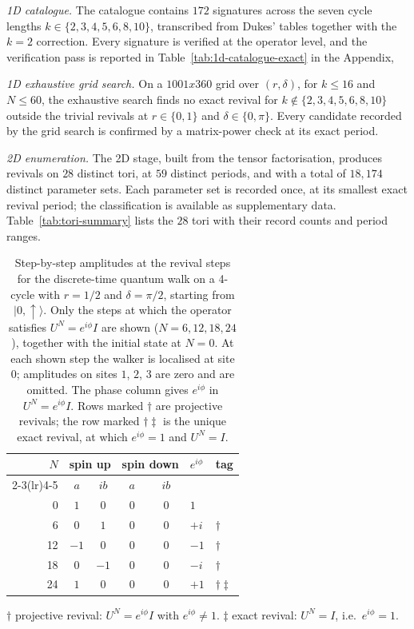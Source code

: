 \documentclass[aps,pra,reprint,amsmath,amssymb,superscriptaddress,floatfix]{revtex4-2}
\def\times{x}%
\def\rho{r}%
\begin{document}
\emph{1D catalogue.}
The catalogue contains $172$ signatures across the seven cycle
lengths $k \in \{2, 3, 4, 5, 6, 8, 10\}$, transcribed from Dukes'
tables together with the $k = 2$ correction. Every signature is
verified at the operator level, and the verification pass is
reported in Table~\ref{tab:1d-catalogue-exact} in the Appendix, 

\emph{1D exhaustive grid search.}
On a $1001 \times 360$ grid over $(\rho, \delta)$, for $k \le 16$
and $N \le 60$, the exhaustive search finds no exact revival for
$k \notin \{2, 3, 4, 5, 6, 8, 10\}$ outside the trivial revivals
at $\rho \in \{0, 1\}$ and $\delta \in \{0, \pi\}$. Every candidate
recorded by the grid search is confirmed by a matrix-power check at
its exact period.  

\emph{2D enumeration.}
The 2D stage, built from the tensor factorisation, produces
revivals on $28$ distinct tori, at $59$ distinct periods, and with
a total of $18{,}174$ distinct parameter sets. Each parameter set is
recorded once, at its smallest exact revival period; the
classification is available as supplementary data.
Table~\ref{tab:tori-summary} lists the $28$ tori with their record
counts and period ranges.
\par
\begin{table}[htbp]
\centering
\caption{Step-by-step amplitudes at the revival steps for the
discrete-time quantum walk on a 4-cycle with $\rho = 1/2$ and
$\delta = \pi/2$, starting from $|0, \uparrow\rangle$. Only the
steps at which the operator satisfies $U^N = e^{i\phi} I$ are shown
($N = 6, 12, 18, 24$), together with the initial state at $N = 0$.
At each shown step the walker is localised at site $0$; amplitudes
on sites $1$, $2$, $3$ are zero and are omitted. The phase column
gives $e^{i\phi}$ in $U^N = e^{i\phi} I$. Rows marked $\dagger$ are
projective revivals; the row marked $\dagger\ddagger$ is the unique
exact revival, at which $e^{i\phi} = 1$ and $U^N = I$. }
\label{tab:k4-demo}
\small
\setlength{\tabcolsep}{6pt}
\renewcommand{\arraystretch}{1.2}
\begin{tabular}{@{}r c c c c l l@{}}
\toprule
$N$ & \multicolumn{2}{c}{spin up} & \multicolumn{2}{c}{spin down} & $e^{i\phi}$ & tag \\
\cmidrule(lr){2-3}\cmidrule(lr){4-5}
 & $a$ & $ib$ & $a$ & $ib$ & & \\
\midrule
0  & $1$  & $0$  & $0$ & $0$ & $1$  & \\
6  & $0$  & $1$  & $0$ & $0$ & $+i$ & $\dagger$ \\
12 & $-1$ & $0$  & $0$ & $0$ & $-1$ & $\dagger$ \\
18 & $0$  & $-1$ & $0$ & $0$ & $-i$ & $\dagger$ \\
24 & $1$  & $0$  & $0$ & $0$ & $+1$ & $\dagger\ddagger$ \\
\bottomrule
\end{tabular}
\vspace{0.5em}
\begin{minipage}{\linewidth}
\footnotesize
$\dagger$ projective revival: $U^N = e^{i\phi} I$ with
$e^{i\phi} \neq 1$. $\ddagger$ exact revival: $U^N = I$, i.e.\
$e^{i\phi} = 1$.
\end{minipage}
\end{table}
\end{document}
